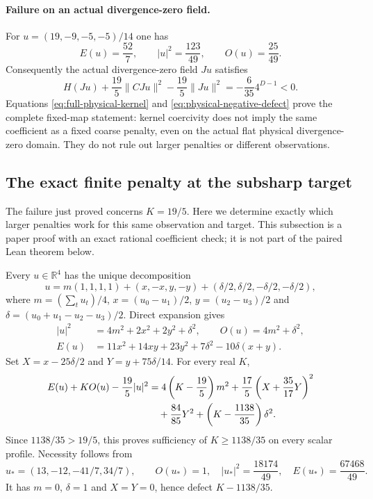 \paragraph{Failure on an actual divergence-zero field.}
For $u=(19,-9,-5,-5)/14$ one has
\[
 E(u)=\frac{52}{7},\qquad |u|^2=\frac{123}{49},\qquad
 O(u)=\frac{25}{49}.
\]
Consequently the actual divergence-zero field $Ju$ satisfies
\begin{equation}\label{eq:physical-negative-defect}
 H(Ju)+\frac{19}{5}\|CJu\|^2-\frac{19}{5}\|Ju\|^2
       =-\frac{6}{35}4^{D-1}<0.
\end{equation}
Equations \eqref{eq:full-physical-kernel} and
\eqref{eq:physical-negative-defect} prove the complete fixed-map statement:
kernel coercivity does not imply the same coefficient as a fixed coarse
penalty, even on the actual flat physical divergence-zero domain.
They do not rule out larger penalties or different observations.

\subsection{The exact finite penalty at the subsharp target}\label{sec:cycle-subsharp}
The failure just proved concerns $K=19/5$. Here we determine exactly
which larger penalties work for this same observation and target.
This subsection is a paper proof with an exact rational coefficient
check; it is not part of the paired Lean theorem below.

Every $u\in\mathbb R^4$ has the unique decomposition
\[
 u=m(1,1,1,1)+(x,-x,y,-y)
       +(\delta/2,\delta/2,-\delta/2,-\delta/2),
\]
where $m=(\sum_tu_t)/4$, $x=(u_0-u_1)/2$, $y=(u_2-u_3)/2$
and $\delta=(u_0+u_1-u_2-u_3)/2$. Direct expansion gives
\begin{align*}
 |u|^2&=4m^2+2x^2+2y^2+\delta^2,\qquad O(u)=4m^2+\delta^2,\\
 E(u)&=11x^2+14xy+23y^2+7\delta^2-10\delta(x+y).
\end{align*}
Set $X=x-25\delta/2$ and $Y=y+75\delta/14$. For every real $K$,
\begin{align}
 E(u)+KO(u)-\frac{19}{5}|u|^2
 &=4\left(K-\frac{19}{5}\right)m^2
   +\frac{17}{5}\left(X+\frac{35}{17}Y\right)^2\notag\\
 &\quad+\frac{84}{85}Y^2
   +\left(K-\frac{1138}{35}\right)\delta^2.
 \label{eq:exact-subsharp-square}
\end{align}
Since $1138/35>19/5$, this proves sufficiency of $K\geq1138/35$
on every scalar profile. Necessity follows from
\[
 u_*=(13,-12,-41/7,34/7),\qquad
 O(u_*)=1,\quad |u_*|^2=\frac{18174}{49},\quad
 E(u_*)=\frac{67468}{49}.
\]
It has $m=0$, $\delta=1$ and $X=Y=0$, hence defect $K-1138/35$.

